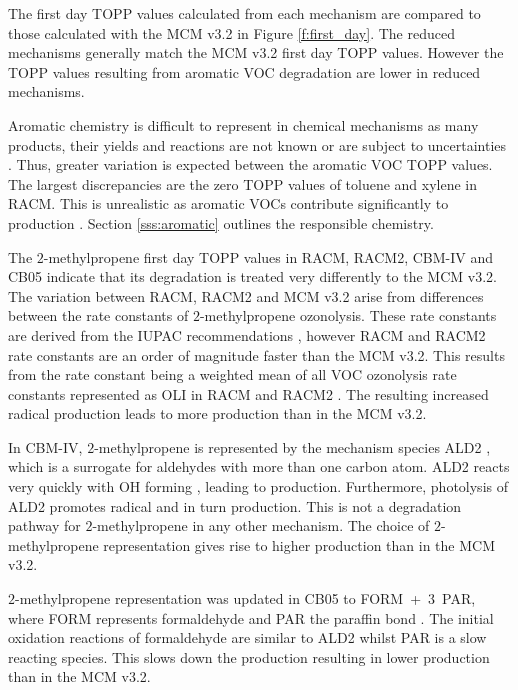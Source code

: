 The first day TOPP values calculated from each mechanism are compared to those calculated with the MCM v3.{2} in Figure \ref{f:first_day}. 
The reduced mechanisms generally match the MCM v3.2 first day TOPP values. 
However the TOPP values resulting from aromatic VOC degradation are lower in reduced mechanisms.

Aromatic chemistry is difficult to represent in chemical mechanisms as many products, their yields and reactions are not known or are subject to uncertainties \citep{Vereecken:2012}. 
Thus, greater variation is expected between the aromatic VOC TOPP values.
The largest discrepancies are the zero TOPP values of toluene and xylene in RACM. 
This is unrealistic as aromatic VOCs contribute significantly to  production \citep{Derwent:1998}. 
Section \ref{sss:aromatic} outlines the responsible chemistry.

The $2$-methylpropene first day TOPP values in RACM, RACM2, CBM-IV and CB05 indicate that its degradation is treated very differently to the MCM v3.2. 
The variation between RACM, RACM2 and MCM v3.2 arise from differences between the rate constants of $2$-methylpropene ozonolysis. 
These rate constants are derived from the IUPAC recommendations \citep{IUPAC_Site}, however RACM and RACM2 rate constants are an order of magnitude faster than the MCM v3.2.
This results from the rate constant being a weighted mean of all VOC ozonolysis rate constants represented as OLI in RACM and RACM2 \citep{Stockwell:1997, Goliff:2013}.
The resulting increased radical production leads to more  production than in the MCM v3.2.

In CBM-IV, $2$-methylpropene is represented by the mechanism species ALD2 \citep{Hogo:1989}, which is a surrogate for aldehydes with more than one carbon atom. 
ALD2 reacts very quickly with OH forming , leading to  production. 
Furthermore, photolysis of ALD2 promotes radical and in turn  production. 
This is not a degradation pathway for $2$-methylpropene in any other mechanism. 
The choice of $2$-methylpropene representation gives rise to higher  production than in the MCM v3.2.

$2$-methylpropene representation was updated in CB05 to \mbox{FORM + $3$ PAR}, where FORM represents formaldehyde and PAR the paraffin  bond \citep{Yarwood:2005}. 
The initial oxidation reactions of formaldehyde are similar to ALD2 whilst PAR is a slow reacting species. 
This slows down the  production resulting in lower  production than in the MCM v3.2.

